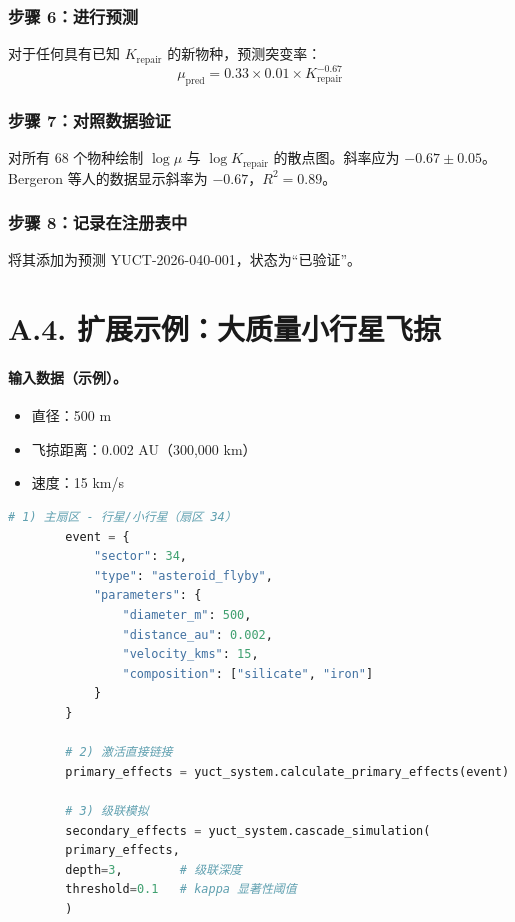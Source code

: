 \documentclass[11pt,a4paper]{article}
\begin{document}
	\subsubsection*{步骤 6：进行预测}
	对于任何具有已知 \(K_{\mathrm{repair}}\) 的新物种，预测突变率：
	\[
	\mu_{\mathrm{pred}} = 0.33 \times 0.01 \times K_{\mathrm{repair}}^{-0.67}
	\]
	
	\subsubsection*{步骤 7：对照数据验证}
	对所有 68 个物种绘制 \(\log \mu\) 与 \(\log K_{\mathrm{repair}}\) 的散点图。斜率应为 \(-0.67 \pm 0.05\)。Bergeron 等人的数据显示斜率为 \(-0.67\)，\(R^2 = 0.89\)。
	
	\subsubsection*{步骤 8：记录在注册表中}
	将其添加为预测 YUCT-2026-040-001，状态为“已验证”。
	
	\section*{A.4. 扩展示例：大质量小行星飞掠}
	
	\paragraph{输入数据（示例）。}
	\begin{itemize}[leftmargin=*]
		\item 直径：500 m
		\item 飞掠距离：0.002 AU（300,000 km）
		\item 速度：15 km/s
	\end{itemize}
	
	\begin{lstlisting}[language=Python]
		# 1) 主扇区 - 行星/小行星（扇区 34）
		event = {
			"sector": 34,
			"type": "asteroid_flyby",
			"parameters": {
				"diameter_m": 500,
				"distance_au": 0.002,
				"velocity_kms": 15,
				"composition": ["silicate", "iron"]
			}
		}
		
		# 2) 激活直接链接
		primary_effects = yuct_system.calculate_primary_effects(event)
		
		# 3) 级联模拟
		secondary_effects = yuct_system.cascade_simulation(
		primary_effects,
		depth=3,        # 级联深度
		threshold=0.1   # kappa 显著性阈值
		)
	\end{lstlisting}
	
\end{document}
